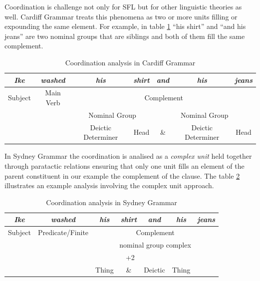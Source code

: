 Coordination is challenge not only for SFL but for other linguistic theories as well. Cardiff Grammar treats this phenomena as two or more units filling or expounding the same element. For example, in table \ref{ex:Cardiff-example-analisys} ``his shirt'' and ``and his jeans'' are two nominal groups that are siblings and both of them fill the same complement. 

\begin{table}[h]
	\centering
	\begin{tabular}{|c|c|c|c|c|c|c|}
		\hline
		\textit{Ike} & \textit{washed} & \textit{his} & \textit{shirt} & \textit{and} & \textit{his} & \textit{jeans} \\ \hline
		Subject         & Main Verb               & \multicolumn{5}{c|}{Complement}                                                    \\ \hline
		&                 & \multicolumn{2}{c|}{Nominal Group}      & \multicolumn{3}{c|}{Nominal Group}                     \\ \hline
		&                 & Deictic Determiner           & Head              & \&           & Deictic Determiner           & Head              \\ \hline
	\end{tabular}
	\caption{Coordination analysis in Cardiff Grammar}
	\label{ex:Cardiff-example-analisys}
\end{table}

In Sydney Grammar the coordination is analised as a \textit{complex unit} held together through paratactic relations ensuring that only one unit fills an element of the parent constituent in our example the complement of the clause. The table \ref{ex:Sydeny-example-analisys} illustrates an example analysis involving the complex unit approach. 

\begin{table}[h]
	\centering
	\begin{tabular}{|c|c|c|c|c|c|c|}
		\hline
		\textit{Ike}     & \textit{washed}      & \textit{his} & \textit{shirt} & \textit{and} & \textit{his} & \textit{jeans} \\ \hline
		Subject          & Predicate/Finite     & \multicolumn{5}{c|}{Complement}                                              \\ \hline
		\multicolumn{2}{|c|}{\multirow{3}{*}{}} & \multicolumn{5}{c|}{nominal group complex}                                   \\ \cline{3-7} 
		\multicolumn{2}{|c|}{}                  & \multicolumn{2}{c|}{1}        & \multicolumn{3}{c|}{+2}                      \\ \cline{3-7} 
		\multicolumn{2}{|c|}{}                  & Deictic      & Thing          & \&           & Deictic      & Thing          \\ \hline
	\end{tabular}
	\caption{Coordination analysis in Sydney Grammar}
	\label{ex:Sydeny-example-analisys}
\end{table}

